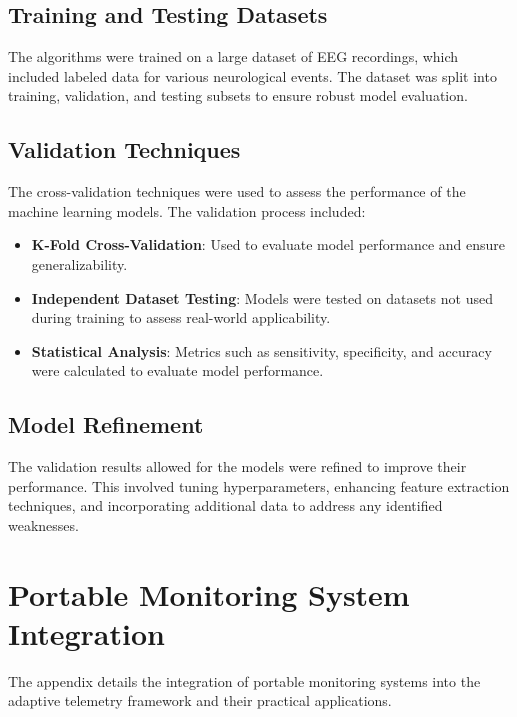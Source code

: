 \documentclass[12pt,journal,compsoc]{IEEEtran}
\begin{document}
\subsection{Training and Testing Datasets}
The algorithms were trained on a large dataset of EEG recordings, which included labeled data for various neurological events. The dataset was split into training, validation, and testing subsets to ensure robust model evaluation.

\subsection{Validation Techniques}
The cross-validation techniques were used to assess the performance of the machine learning models. The validation process included:
\begin{itemize}
    \item \textbf{K-Fold Cross-Validation}: Used to evaluate model performance and ensure generalizability.
    \item \textbf{Independent Dataset Testing}: Models were tested on datasets not used during training to assess real-world applicability.
    \item \textbf{Statistical Analysis}: Metrics such as sensitivity, specificity, and accuracy were calculated to evaluate model performance.
\end{itemize}

\subsection{Model Refinement}
The validation results allowed for the models were refined to improve their performance. This involved tuning hyperparameters, enhancing feature extraction techniques, and incorporating additional data to address any identified weaknesses.

\section{Portable Monitoring System Integration}
The appendix details the integration of portable monitoring systems into the adaptive telemetry framework and their practical applications.
\end{document}
